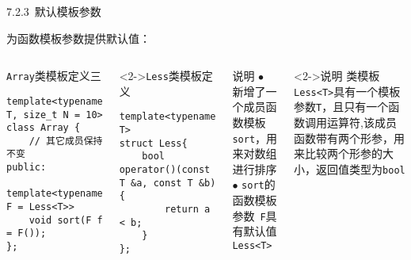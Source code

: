 \begin{frame}[fragile]{7.2.3~默认模板参数}

为\alert{函数模板参数}提供默认值：

\vspace{-4mm}

\begin{columns}[t]

\begin{blueblock}{\texttt{Array}类模板定义三}
\vspace{-2mm}\begin{lstlisting}[moreemph={Array,T,Less,F}]
template<typename T, size_t N = 10>
class Array {
    // 其它成员保持不变
public:
    template<typename F = Less<T>>
    void sort(F f = F());
};
\end{lstlisting}\vspace{-2mm}
\end{blueblock}
\begin{blueblock}<2->{\texttt{Less}类模板定义}
\vspace{-2mm}\begin{lstlisting}[moreemph={Less,T}]
template<typename T>
struct Less{
    bool operator()(const T &a, const T &b) {
        return a < b;
    }
};
\end{lstlisting}\vspace{-2mm}
\end{blueblock}

\begin{yellowblock}{说明}
$\bullet$ 新增了一个成员函数模板\texttt{sort}，用来对数组进行排序\\
$\bullet$ \texttt{sort}的\alert{函数模板参数}~\texttt{F}具有默认值\texttt{Less<T>}
\end{yellowblock}
\begin{yellowblock}<2->{说明}
类模板\texttt{Less<T>}具有一个模板参数\texttt{T}，且只有一个函数调用运算符,该成员函数带有两个形参，用来比较两个形参的大小，返回值类型为\texttt{bool}
\end{yellowblock}

\end{columns}

\end{frame}


